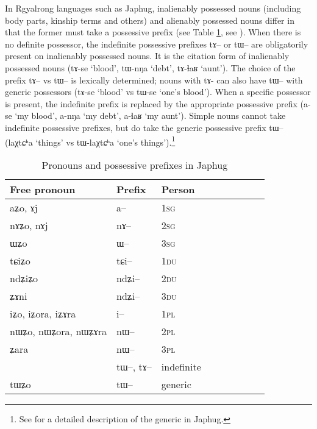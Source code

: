 \documentclass[oldfontcommands,oneside,a4paper,11pt]{article}
\newcommand{\ipa}[1]{{\phon #1}} %
\begin{document}
In Rgyalrong languages such as Japhug, inalienably possessed nouns (including body parts, kinship terms and others) and alienably possessed nouns differ in that the former must take a possessive prefix (see Table \ref{tab:pronoun}, see \citealt[1212]{jacques12incorp}). When there is no definite possessor, the indefinite possessive prefixes \ipa{tɤ--} or \ipa{tɯ--} are obligatorily present on inalienably possessed nouns. It is the citation form of inalienably possessed nouns (\ipa{tɤ-se} `blood', \ipa{tɯ-nŋa} `debt', \ipa{tɤ-ɬaʁ} `aunt'). The choice of the prefix \ipa{tɤ--} vs \ipa{tɯ--} is lexically determined; nouns with \ipa{tɤ-} can also have \ipa{tɯ--} with generic possessors (\ipa{tɤ-se} `blood' vs \ipa{tɯ-se} `one's blood').  When a specific possessor is present, the indefinite prefix is replaced by the appropriate possessive prefix (\ipa{a-se} `my blood', \ipa{a-nŋa} `my debt', \ipa{a-ɬaʁ} `my aunt').  Simple nouns cannot take indefinite possessive prefixes, but do take the generic possessive prefix \ipa{tɯ--} (\ipa{laχtɕʰa} `things' vs \ipa{tɯ-laχtɕʰa} `one's things').\footnote{See \citet{jacques15generic} for a detailed description of the generic in Japhug.}

\begin{table}[H] \centering
\caption{Pronouns and possessive prefixes in Japhug}\label{tab:pronoun}
\begin{tabular}{lllllllll} 
\toprule
 Free pronoun & Prefix & Person\\
\midrule
 \ipa{aʑo},    \ipa{ɤj} &	\ipa{a--}  &		1\textsc{sg} \\
\ipa{nɤʑo},  \ipa{nɤj} &	\ipa{nɤ--}  &			2\textsc{sg}\\
\ipa{ɯʑo}  &	\ipa{ɯ--}  &			3\textsc{sg}\\
\midrule
\ipa{tɕiʑo}  &	\ipa{tɕi--}  &			1\textsc{du} \\
\ipa{ndʑiʑo}  &	\ipa{ndʑi--}  &		2\textsc{du} \\	
\ipa{ʑɤni}  &	\ipa{ndʑi--}  &		3\textsc{du} \\	
\midrule
\ipa{iʑo}, \ipa{iʑora},   \ipa{iʑɤra}   &	\ipa{i--}  &			1\textsc{pl} \\
\ipa{nɯʑo}, \ipa{nɯʑora},   \ipa{nɯʑɤra}  &	\ipa{nɯ--}  &			2\textsc{pl} \\
\ipa{ʑara}  &	\ipa{nɯ--}  &			3\textsc{pl} \\
\midrule
&  \ipa{tɯ--},  \ipa{tɤ--} & indefinite \\
\ipa{tɯʑo} & \ipa{tɯ--}   &  generic\\
\bottomrule
\end{tabular}
\end{table}
\end{document}
